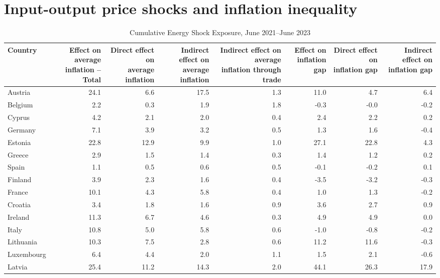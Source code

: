 \documentclass[11pt]{article}
\begin{document}
\section*{Input-output price shocks and inflation inequality}
\begin{table}[H]
\centering
\caption{Cumulative Energy Shock Exposure, June 2021--June 2023}
\scriptsize
\setlength{\tabcolsep}{1.2pt}
\begin{tabular}{lrrrrrrr}
\toprule
Country & \shortstack{Effect on average\\inflation -- Total} & \shortstack{Direct effect on\\average inflation} & \shortstack{Indirect effect on\\average inflation} & \shortstack{Indirect effect on average\\inflation through trade} & \shortstack{Effect on\\inflation gap} & \shortstack{Direct effect on\\inflation gap} & \shortstack{Indirect effect on\\inflation gap}
 \\
\midrule
Austria & 24.1 & 6.6 & 17.5 & 1.3 & 11.0 & 4.7 & 6.4
 \\
Belgium & 2.2 & 0.3 & 1.9 & 1.8 & -0.3 & -0.0 & -0.2
 \\
Cyprus & 4.2 & 2.1 & 2.0 & 0.4 & 2.4 & 2.2 & 0.2
 \\
Germany & 7.1 & 3.9 & 3.2 & 0.5 & 1.3 & 1.6 & -0.4
 \\
Estonia & 22.8 & 12.9 & 9.9 & 1.0 & 27.1 & 22.8 & 4.3
 \\
Greece & 2.9 & 1.5 & 1.4 & 0.3 & 1.4 & 1.2 & 0.2
 \\
Spain & 1.1 & 0.5 & 0.6 & 0.5 & -0.1 & -0.2 & 0.1
 \\
Finland & 3.9 & 2.3 & 1.6 & 0.4 & -3.5 & -3.2 & -0.3
 \\
France & 10.1 & 4.3 & 5.8 & 0.4 & 1.0 & 1.3 & -0.2
 \\
Croatia & 3.4 & 1.8 & 1.6 & 0.9 & 3.6 & 2.7 & 0.9
 \\
Ireland & 11.3 & 6.7 & 4.6 & 0.3 & 4.9 & 4.9 & 0.0
 \\
Italy & 10.8 & 5.0 & 5.8 & 0.6 & -1.0 & -0.8 & -0.2
 \\
Lithuania & 10.3 & 7.5 & 2.8 & 0.6 & 11.2 & 11.6 & -0.3
 \\
Luxembourg & 6.4 & 4.4 & 2.0 & 1.1 & 1.5 & 2.1 & -0.6
 \\
Latvia & 25.4 & 11.2 & 14.3 & 2.0 & 44.1 & 26.3 & 17.9
 \\

\end{tabular}
\end{table}
\end{document}
